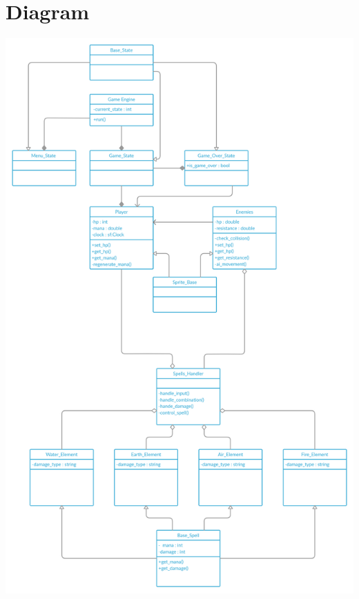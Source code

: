 \documentclass{TDP005mall}
\begin{document}
\section{Diagram}
\begin{center}
\includegraphics[scale=0.18]{uml_diagram.jpg}
\end{center}
\end{document}
